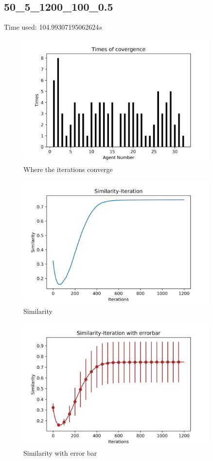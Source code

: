 \documentclass[a4paper,12pt]{article}
\begin{document}
        \subsection{50\_5\_1200\_100\_0.5}
    Time used: 104.99307195062624${s}$
    \begin{figure}[H]
    	\centering
    	\includegraphics[width=0.9\textwidth]{agt50_5_1200_1000_5.png}
    	\caption{Where the iterations converge}\label{agt50_5_1200_1000.5_h}
    \end{figure}
    \begin{figure}[H]
    	\centering
    	\includegraphics[width=0.9\textwidth]{Sim50_5_1200_1000_5}
    	\caption{Similarity}\label{Sim50_5_1200_1000.5_h}
    \end{figure}
    \begin{figure}[H]
    	\centering
    	\includegraphics[width=0.9\textwidth]{SimErr50_5_1200_1000_5}
    	\caption{Similarity with error bar}\label{SimErr50_5_1200_1000.5_h}
    \end{figure}
\end{document}
